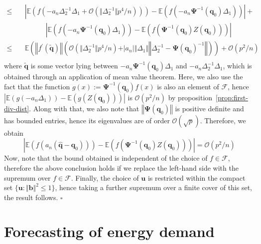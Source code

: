 \documentclass[aos]{imsart}
\theoremstyle{plain}
\theoremstyle{remark}
\def\E{\mathbb{E}}
\newcommand{\dash}{^{\prime}}
\newcommand{\bb}[1]{\boldsymbol{#1}}
\newenvironment{pfofThm}{\noindent{\bf Proof of Theorem}}{\hfill $\square$ \\}
\begin{document}
\begin{pfofThm}
\begin{align*}
        \leq & \quad \left\vert \E\left( f\left( -a_n \Delta_{2}^{-1} \Delta_1 + \mathcal{O}(\Vert \Delta_2^{-1}\Vert p^4/n) \right) \right) - \E\left( f\left( -a_n\bb{\Psi}^{-1}(\bb{q}_0) \Delta_1 \right)  \right) \right\vert + \\
        & \qquad \qquad \left\vert \E\left( f\left( -a_n\bb{\Psi}^{-1}(\bb{q}_0) \Delta_1 \right) \right) - \E\left( f\left( \bb{\Psi}^{-1}(\bb{q}_0) Z(\bb{q}_0) \right)  \right) \right\vert\\
        \leq & \quad \E\left( \left\Vert f\dash(\widetilde{\bb{q}}) \right\Vert \left( \mathcal{O}(\Vert \Delta_2^{-1}\Vert p^4/n) + \vert a_n\vert \Vert \Delta_1 \Vert \left\Vert \Delta_2^{-1} - \bb{\Psi}(\bb{q}_0)^{-1} \right\Vert  \right) \right) + \mathcal{O}(p^2/n)\\
    \end{align*}
    \noindent where $\widetilde{\bb{q}}$ is some vector lying between $-a_n\bb{\Psi}^{-1}(\bb{q}_0) \Delta_1$ and  $-a_n \Delta_{2}^{-1} \Delta_1$, which is obtained through an application of mean value theorem. Here, we also use the fact that the function $g(x) := \bb{\Psi}^{-1}(\bb{q}_0) f(x)$ is also an element of $\mathcal{F}$, hence $\left\vert \E\left( g\left( -a_n \Delta_1 \right) \right) - \E\left( g\left( Z(\bb{q}_0) \right)  \right) \right\vert$ is $\mathcal{O}(p^2/n)$ by proposition~\ref{prop:first-div-dist}. Along with that, we also note that $\left\Vert \bb{\Psi}(\bb{q}_0) \right\Vert$ is positive definite and has bounded entries, hence its eigenvalues are of order $\mathcal{O}(\sqrt{p})$. Therefore, we obtain
    \begin{equation*}
        \left\vert \E\left( f\left( a_n\left( \widehat{\bb{q}} - \bb{q}_0 \right) \right) \right) - \E\left( f\left( \bb{\Psi}^{-1}(\bb{q}_0) Z(\bb{q}_0) \right)  \right) \right\vert
        = \mathcal{O}(p^2/n)
    \end{equation*} 
    \noindent Now, note that the bound obtained is independent of the choice of $f \in \mathcal{F}$, therefore the above conclusion holds if we replace the left-hand side with the supremum over $f \in \mathcal{F}$. Finally, the choice of $\bb{u}$ is restricted within the compact set $\{ \bb{u}: \Vert \bb{b}\Vert^2 \leq 1 \}$, hence taking a further supremum over a finite cover of this set, the result follows.
\end{pfofThm}


\section{Forecasting of energy demand}
\label{Sec:real-data}
\end{document}
